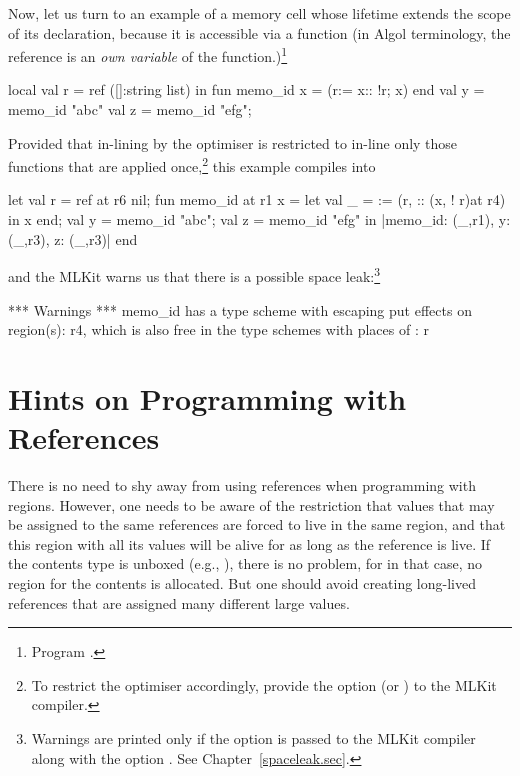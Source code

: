 \documentclass[12pt]{book}
\begin{document}
Now, let us turn to an example of a memory cell whose lifetime extends the scope
of its declaration, because it is accessible via a function (in Algol
terminology, the reference is an {\em own variable}
%
%
%
of the function.)\footnote{Program .}
\begin{smlcode}
  local
    val r = ref ([]:string list)
  in
    fun memo_id x = (r:= x:: !r; x)
  end
  val y = memo_id "abc"
  val z = memo_id "efg";
\end{smlcode}
Provided that in-lining by the optimiser is restricted to in-line only those
functions that are applied once,\footnote{To restrict the optimiser accordingly,
provide the option  (or )
to the MLKit compiler.} this example compiles into
\begin{smlcode}
  let val r = ref at r6 nil;
      fun memo_id at r1 x =
          let val _ = := (r, :: (x, ! r)at r4) in x end;
      val y = memo_id "abc";
      val z = memo_id "efg"
  in  {|memo_id: (_,r1), y: (_,r3), z: (_,r3)|}
  end
\end{smlcode}
and the MLKit warns us that there is a possible space leak:\footnote{Warnings
are printed only if the option  is passed to the
MLKit compiler along with the option . See
Chapter~\ref{spaceleak.sec}.}
\begin{scriptcode}
 *** Warnings ***
memo_id  has a type scheme with escaping put effects on region(s):
r4, which is also free in the type schemes with places of :  r
\end{scriptcode}

\section{Hints on Programming  with References}

There is no need to shy away from using references when programming with
regions. However, one needs to be aware of the restriction that values that may
be assigned to the same references are forced to live in the same region, and
that this region with all its values will be alive for as long as the reference
is live. If the contents type is unboxed (e.g., ), there is no problem,
for in that case, no region for the contents is allocated. But one should avoid
creating long-lived references that are assigned many different large values.

\end{document}
